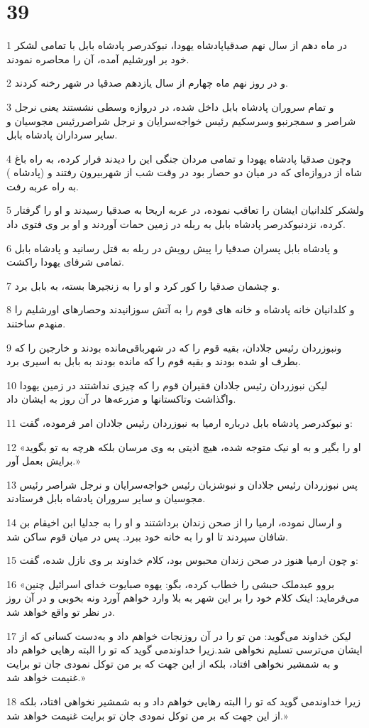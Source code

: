 \chapter{39}

\par 1 در ماه دهم از سال نهم صدقیاپادشاه یهودا، نبوکدرصر پادشاه بابل با تمامی لشکر خود بر اورشلیم آمده، آن را محاصره نمودند. 
\par 2 و در روز نهم ماه چهارم از سال یازدهم صدقیا در شهر رخنه کردند.
\par 3 و تمام سروران پادشاه بابل داخل شده، در دروازه وسطی نشستند یعنی نرجل شراصر و سمجرنبو وسرسکیم رئیس خواجه‌سرایان و نرجل شراصررئیس مجوسیان و سایر سرداران پادشاه بابل.
\par 4 وچون صدقیا پادشاه یهودا و تمامی مردان جنگی این را دیدند فرار کرده، به راه باغ شاه از دروازه‌ای که در میان دو حصار بود در وقت شب از شهربیرون رفتند و (پادشاه ) به راه عربه رفت.
\par 5 ولشکر کلدانیان ایشان را تعاقب نموده، در عربه اریحا به صدقیا رسیدند و او را گرفتار کرده، نزدنبوکدرصر پادشاه بابل به ربله در زمین حمات آوردند و او بر وی فتوی داد.
\par 6 و پادشاه بابل پسران صدقیا را پیش رویش در ربله به قتل رسانید و پادشاه بابل تمامی شرفای یهودا راکشت.
\par 7 و چشمان صدقیا را کور کرد و او را به زنجیرها بسته، به بابل برد.
\par 8 و کلدانیان خانه پادشاه و خانه های قوم را به آتش سوزانیدند وحصارهای اورشلیم را منهدم ساختند.
\par 9 ونبوزردان رئیس جلادان، بقیه قوم را که در شهرباقی‌مانده بودند و خارجین را که بطرف او شده بودند و بقیه قوم را که مانده بودند به بابل به اسیری برد.
\par 10 لیکن نبوزردان رئیس جلادان فقیران قوم را که چیزی نداشتند در زمین یهودا واگذاشت وتاکستانها و مزرعه‌ها در آن روز به ایشان داد.
\par 11 و نبوکدرصر پادشاه بابل درباره ارمیا به نبوزردان رئیس جلادان امر فرموده، گفت:
\par 12 «او را بگیر و به او نیک متوجه شده، هیچ اذیتی به وی مرسان بلکه هر‌چه به تو بگوید برایش بعمل آور.»
\par 13 پس نبوزردان رئیس جلادان و نبوشزبان رئیس خواجه‌سرایان و نرجل شراصر رئیس مجوسیان و سایر سروران پادشاه بابل فرستادند.
\par 14 و ارسال نموده، ارمیا را از صحن زندان برداشتند و او را به جدلیا ابن اخیقام بن شافان سپردند تا او را به خانه خود ببرد. پس در میان قوم ساکن شد.
\par 15 و چون ارمیا هنوز در صحن زندان محبوس بود، کلام خداوند بر وی نازل شده، گفت:
\par 16 «بروو عبدملک حبشی را خطاب کرده، بگو: یهوه صبایوت خدای اسرائیل چنین می‌فرماید: اینک کلام خود را بر این شهر به بلا وارد خواهم آورد ونه بخوبی و در آن روز در نظر تو واقع خواهد شد.
\par 17 لیکن خداوند می‌گوید: من تو را در آن روزنجات خواهم داد و به‌دست کسانی که از ایشان می‌ترسی تسلیم نخواهی شد.زیرا خداوندمی گوید که تو را البته رهایی خواهم داد و به شمشیر نخواهی افتاد، بلکه از این جهت که بر من توکل نمودی جان تو برایت غنیمت خواهد شد.»
\par 18 زیرا خداوندمی گوید که تو را البته رهایی خواهم داد و به شمشیر نخواهی افتاد، بلکه از این جهت که بر من توکل نمودی جان تو برایت غنیمت خواهد شد.»
 
